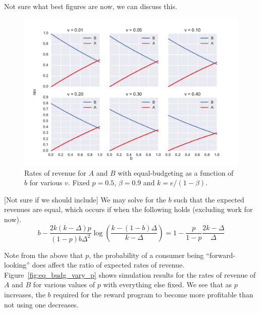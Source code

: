{\nolan Not sure what best figures are now, we can discuss this.}

\begin{figure}[h!]
\begin{centering}
\includegraphics[scale = 0.75]{./figures/eq_budg_vary_v_p05.pdf}
\caption{Rates of revenue for $A$ and $B$ with equal-budgeting as a function of $b$ for various $v$. Fixed $p = 0.5$, $\beta = 0.9$ and $k = e/(1-\beta)$.}
\label{fig:eq_budg_vary_v}
\end{centering}
\end{figure}

[Not sure if we should include] We may solve for the $b$ such that the expected revenues are equal, which occurs if when the following holds (excluding work for now).
\begin{equation*}
b-\frac{2k(k-\Delta)p}{(1-p)b\Delta^2}\log \left(\frac{k-(1-b)\Delta}{k-\Delta} \right) = 1-\frac{p}{1-p} \frac{2k-\Delta}{\Delta}
\end{equation*}

Note from the above that $p$, the probability of a consumer being ``forward-looking'' does affect the ratio of expected rates of revenue. Figure~\ref{fig:eq_budg_vary_p} shows simulation results for the rates of revenue of $A$ and $B$ for various values of $p$ with everything else fixed. We see that as $p$ increases, the $b$ required for the reward program to become more profitable than not using one decreases.

